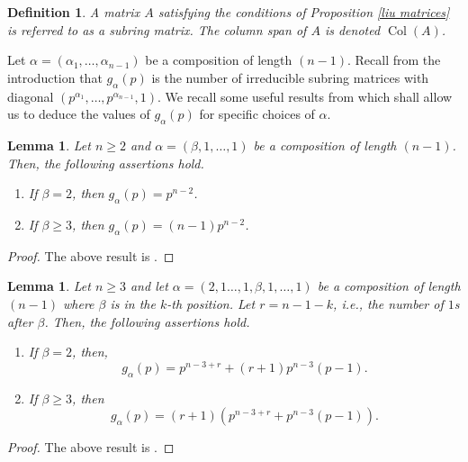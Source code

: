 \documentclass[a4paper]{amsart}
\newtheorem{lemma}[theorem]{Lemma}
\newtheorem{definition}[theorem]{Definition}
\numberwithin{equation}{section}
\theoremstyle{remark}
\newcommand{\op}[1]{\operatorname{#1}}
\begin{document}
\begin{definition}\label{subring matrix def}
A matrix $A$ satisfying the conditions of Proposition \ref{liu matrices} is referred to as a \emph{subring} matrix. The column span of $A$ is denoted $\op{Col}(A)$. 
\end{definition}

Let $\alpha=(\alpha_1, \dots, \alpha_{n-1})$ be a composition of length $(n-1)$. Recall from the introduction that $g_\alpha(p)$ is the number of irreducible subring matrices with diagonal $(p^{\alpha_1}, \dots, p^{\alpha_{n-1}}, 1)$. We recall some useful results from \cite{atanasov2021counting, liu2007counting} which shall allow us to deduce the values of $g_\alpha(p)$ for specific choices of $\alpha$. 
	
	\begin{lemma}\label{akkm lemma 3.5}
	Let $n\geq 2$ and $\alpha=(\beta, 1, \dots, 1)$ be a composition of length $(n-1)$. Then, the following assertions hold.
	\begin{enumerate}
	    \item If $\beta=2$, then $g_\alpha(p)=p^{n-2}$.
	    \item If $\beta\geq 3$, then $g_\alpha(p)=(n-1)p^{n-2}$.
	\end{enumerate}
	\end{lemma}
	\begin{proof}
	The above result is \cite[Lemma 3.5]{atanasov2021counting}.
	\end{proof}
	
	
	\begin{lemma}\label{akkm lemma 3.6}
	Let $n\geq 3$ and let $\alpha=(2,1\dots, 1, \beta, 1, \dots, 1)$ be a composition of length $(n-1)$ where $\beta$ is in the $k$-th position. Let $r=n-1-k$, i.e., the number of $1$s after $\beta$. Then, the following assertions hold. 
	\begin{enumerate}
	    \item If $\beta=2$, then, 
	    \[g_\alpha(p)=p^{n-3+r}+(r+1)p^{n-3}(p-1).\]
	    \item If $\beta\geq 3$, then \[g_\alpha(p)=(r+1)\left(p^{n-3+r}+p^{n-3}(p-1)\right).\]
	\end{enumerate}
	\end{lemma}
	\begin{proof}
	The above result is \cite[Lemma 3.6]{atanasov2021counting}.
	\end{proof}
\end{document}
